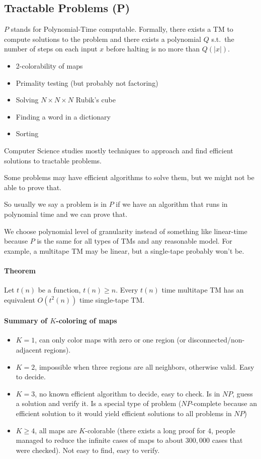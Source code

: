 \documentclass[12 pt]{article}
\begin{document}
\subsection{Tractable Problems (P)}
$P$ stands for Polynomial-Time computable. Formally, there exists a TM
to compute solutions to the problem and there exists a polynomial $Q$
s.t.\ the number of steps on each input $x$ before halting is no more
than $Q(|x|)$.
\begin{itemize}
\item 2-colorability of maps
\item Primality testing (but probably not factoring)
\item Solving $N \times N \times N$ Rubik's cube
\item Finding a word in a dictionary
\item Sorting
\end{itemize}
Computer Science studies mostly techniques to approach and find
efficient solutions to tractable problems.

Some problems may have efficient algorithms to solve them, but we
might not be able to prove that.

So usually we say a problem is in $P$ if we have an algorithm that
runs in polynomial time and we can prove that.

We choose polynomial level of granularity instead of something like
linear-time because $P$ is the same for all types of TMs and any
reasonable model. For example, a multitape TM may be linear, but a
single-tape probably won't be.

\paragraph{Theorem} Let $t(n)$ be a function, $t(n) \geq n$. Every
$t(n)$ time multitape TM has an equivalent $O(t^2(n))$ time
single-tape TM.
\paragraph{Summary of $K$-coloring of maps}
\begin{itemize}
\item $K = 1$, can only color maps with zero or one region (or
  disconnected/non-adjacent regions).
\item $K = 2$, impossible when three regions are all neighbors,
  otherwise valid. Easy to decide.
\item $K = 3$, no known efficient algorithm to decide, easy to
  check. Is in $NP$, guess a solution and verify it. Is a special type
  of problem ($NP$-complete because an efficient solution to it would
  yield efficient solutions to all problems in $NP$)
\item $K \geq 4$, all maps are $K$-colorable (there exists a long
  proof for $4$, people managed to reduce the infinite cases of maps
  to about $300,000$ cases that were checked). Not easy to find, easy
  to verify.
\end{itemize}
\end{document}
